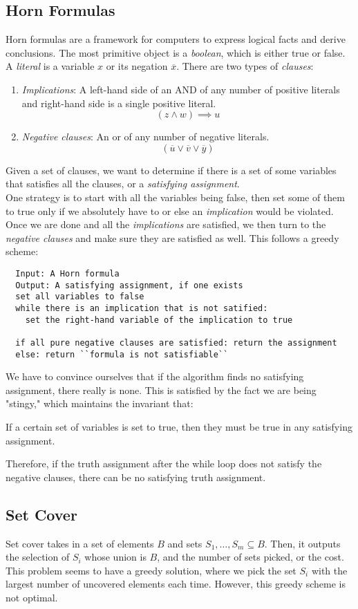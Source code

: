 \subsection{Horn Formulas}
Horn formulas are a framework for computers to express logical facts and derive conclusions.
The most primitive object is a \textit{boolean}, which is either true or false.
A \textit{literal} is a variable $x$ or its negation $\overline{x} $.
There are two types of \textit{clauses}:
\begin{enumerate}
  \item \textit{Implications}: A left-hand side of an AND of any number of positive literals and right-hand side is a single positive literal. $$(z \land w) \implies u$$
  \item \textit{Negative clauses}: An or of any number of negative literals. $$(\overline{u} \lor \overline{v} \lor \overline{y})$$
\end{enumerate}
Given a set of clauses, we want to determine if there is a set of some variables that satisfies all the clauses, or a \textit{satisfying assignment}.\\
One strategy is to start with all the variables being false, then set some of them to true only if we absolutely have to or else an \textit{implication} would be violated.
Once we are done and all the \textit{implications} are satisfied, we then turn to the \textit{negative clauses} and make sure they are satisfied as well.
This follows a greedy scheme:
\begin{verbatim}
  Input: A Horn formula
  Output: A satisfying assignment, if one exists
  set all variables to false
  while there is an implication that is not satified:
    set the right-hand variable of the implication to true

  if all pure negative clauses are satisfied: return the assignment
  else: return ``formula is not satisfiable``
\end{verbatim}
We have to convince ourselves that if the algorithm finds no satisfying assignment, there really is none.
This is satisfied by the fact we are being "stingy," which maintains the invariant that:
\begin{center}
  If a certain set of variables is set to true, then they must be true in any satisfying assignment.
\end{center}
Therefore, if the truth assignment after the while loop does not satisfy the negative clauses, there can be no satisfying truth assignment.

\subsection{Set Cover}
Set cover takes in a set of elements $B$ and sets $S_1, \ldots, S_m \subseteq B$.
Then, it outputs the selection of $S_i$ whose union is $B$, and the number of sets picked, or the cost.
This problem seems to have a greedy solution, where we pick the set $S_i$ with the largest number of uncovered elements each time.
However, this greedy scheme is not optimal.
